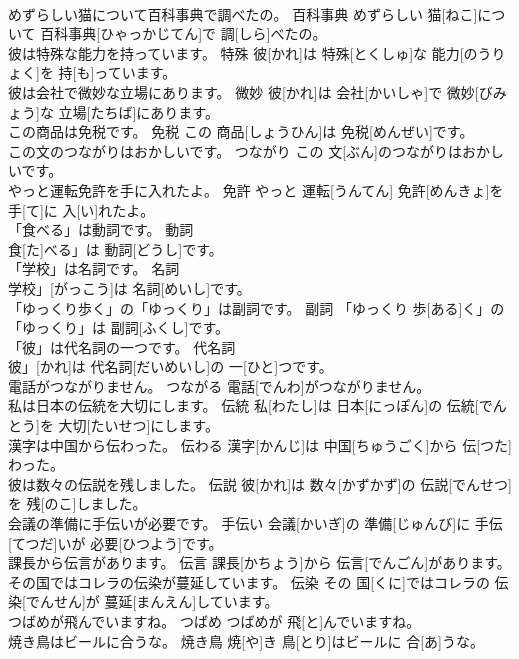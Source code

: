 \documentclass[8pt]{extreport}
\begin{document}
\begin{CJK}{UTF8}{min}
\\	めずらしい猫について百科事典で調べたの。	百科事典	めずらしい 猫[ねこ]について 百科事典[ひゃっかじてん]で 調[しら]べたの。	
\\	彼は特殊な能力を持っています。	特殊	彼[かれ]は 特殊[とくしゅ]な 能力[のうりょく]を 持[も]っています。	
\\	彼は会社で微妙な立場にあります。	微妙	彼[かれ]は 会社[かいしゃ]で 微妙[びみょう]な 立場[たちば]にあります。	
\\	この商品は免税です。	免税	この 商品[しょうひん]は 免税[めんぜい]です。	
\\	この文のつながりはおかしいです。	つながり	この 文[ぶん]のつながりはおかしいです。	
\\	やっと運転免許を手に入れたよ。	免許	やっと 運転[うんてん] 免許[めんきょ]を 手[て]に 入[い]れたよ。	
\\	「食べる」は動詞です。	動詞	
\\	食[た]べる」は 動詞[どうし]です。	
\\	「学校」は名詞です。	名詞	
\\	学校」[がっこう]は 名詞[めいし]です。	
\\	「ゆっくり歩く」の「ゆっくり」は副詞です。	副詞	「ゆっくり 歩[ある]く」の「ゆっくり」は 副詞[ふくし]です。	
\\	「彼」は代名詞の一つです。	代名詞	
\\	彼」[かれ]は 代名詞[だいめいし]の 一[ひと]つです。	
\\	電話がつながりません。	つながる	電話[でんわ]がつながりません。	
\\	私は日本の伝統を大切にします。	伝統	私[わたし]は 日本[にっぽん]の 伝統[でんとう]を 大切[たいせつ]にします。	
\\	漢字は中国から伝わった。	伝わる	漢字[かんじ]は 中国[ちゅうごく]から 伝[つた]わった。	
\\	彼は数々の伝説を残しました。	伝説	彼[かれ]は 数々[かずかず]の 伝説[でんせつ]を 残[のこ]しました。	
\\	会議の準備に手伝いが必要です。	手伝い	会議[かいぎ]の 準備[じゅんび]に 手伝[てつだ]いが 必要[ひつよう]です。	
\\	課長から伝言があります。	伝言	課長[かちょう]から 伝言[でんごん]があります。	
\\	その国ではコレラの伝染が蔓延しています。	伝染	その 国[くに]ではコレラの 伝染[でんせん]が 蔓延[まんえん]しています。	
\\	つばめが飛んでいますね。	つばめ	つばめが 飛[と]んでいますね。	
\\	焼き鳥はビールに合うな。	焼き鳥	焼[や]き 鳥[とり]はビールに 合[あ]うな。	

\end{CJK}
\end{document}
